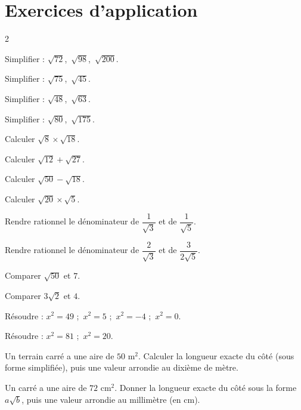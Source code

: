 \section{Exercices d'application}
\begin{multicols}{2}

\exo{} Simplifier : $\sqrt{72}$,\ $\sqrt{98}$,\ $\sqrt{200}$.

\exo{} Simplifier : $\sqrt{75}$,\ $\sqrt{45}$.

\exo{} Simplifier : $\sqrt{48}$,\ $\sqrt{63}$.

\exo{} Simplifier : $\sqrt{80}$,\ $\sqrt{175}$.

\exo{} Calculer $\sqrt8\times\sqrt{18}$.

\exo{} Calculer $\sqrt{12}+\sqrt{27}$.

\exo{} Calculer $\sqrt{50}-\sqrt{18}$.

\exo{} Calculer $\sqrt{20}\times\sqrt5$.

\exo{} Rendre rationnel le dénominateur de $\dfrac1{\sqrt3}$ et de $\dfrac1{\sqrt5}$.

\exo{} Rendre rationnel le dénominateur de $\dfrac2{\sqrt3}$ et de
$\dfrac3{2\sqrt5}$.

\exo{} Comparer $\sqrt{50}$ et $7$.

\exo{} Comparer $3\sqrt2$ et $4$.

\exo{} Résoudre : $x^{2}=49$ ;\ $x^{2}=5$ ;\ $x^{2}=-4$ ;\ $x^{2}=0$.

\exo{} Résoudre : $x^{2}=81$ ;\ $x^{2}=20$.

\exo{} Un terrain carré a une aire de $50\text{ m}^2$. Calculer la longueur exacte
du côté (sous forme simplifiée), puis une valeur arrondie au dixième de mètre.

\exo{} Un carré a une aire de $72\text{ cm}^2$. Donner la longueur exacte du côté
sous la forme $a\sqrt b$, puis une valeur arrondie au millimètre (en cm).

\end{multicols}

